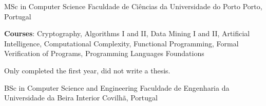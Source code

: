 


\begin{cventries}

\cventry
  {MSc in Computer Science}
  {Faculdade de Ciências da Universidade do Porto}
  {Porto, Portugal}
  {}
  {
    \begin{cvitems}
      \item \textbf{Courses}:
      Cryptography,
      Algorithms I and II,
      Data Mining I and II,
      Artificial Intelligence,
      Computational Complexity,
      Functional Programming,
      Formal Verification of Programs,
      Programming Languages Foundations
      \item Only completed the first year, did not write a thesis.
    \end{cvitems}
  }
  {}

\cventry
  {BSc in Computer Science and Engineering}
  {Faculdade de Engenharia da Universidade da Beira Interior}
  {Covilhã, Portugal}
  {}
  {}
  {}


\end{cventries}

